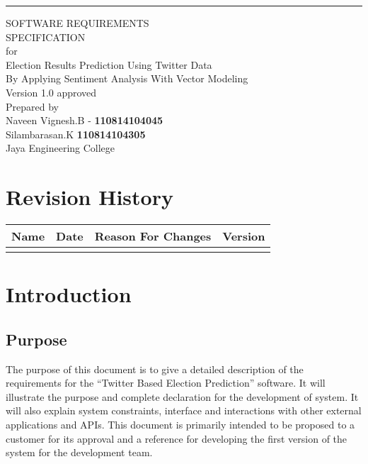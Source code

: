 \documentclass{scrreprt}
\date{}
\def\myversion{1.0 }
\begin{document}
\begin{center}
    \rule{16cm}{5pt}\vskip1cm
    \begin{bfseries}
        \Huge{SOFTWARE REQUIREMENTS\\ SPECIFICATION}\\
        \vspace{1.8cm}
        \LARGE{for}\\
        \vspace{1.6cm}
        \huge{Election Results Prediction Using Twitter Data}\\
        \vspace{0.2cm}
        \LARGE{By Applying Sentiment Analysis With Vector Modeling}\\
        \vspace{1.6cm}
        \huge{Version \myversion approved}\\
        \vspace{1.6cm}
        Prepared by\\ 
        \vspace{0.2cm}
        \LARGE{Naveen Vignesh.B - \textbf{110814104045}}\\
        \LARGE{Silambarasan.K \textbf{110814104305}}\\
        \vspace{1.6cm}
      	  Jaya Engineering College\\
    \end{bfseries}
\end{center}

\tableofcontents


\chapter*{Revision History}

\begin{center}
    \begin{tabular}{|c|c|c|c|}
        \hline
	    Name & Date & Reason For Changes & Version\\
        \hline
	    &  & & \\
        \hline
	   
    \end{tabular}
\end{center}

\chapter{Introduction}

\section{Purpose}
The purpose of this document is to give a detailed description of the requirements for the “Twitter Based Election Prediction” software. It will illustrate the purpose and complete declaration for the
development of system. It will also explain system constraints, interface and interactions with other external applications and APIs. This document is primarily intended to be proposed to a customer 
for its approval and a reference for developing the first version of the system for the development team.
\end{document}

